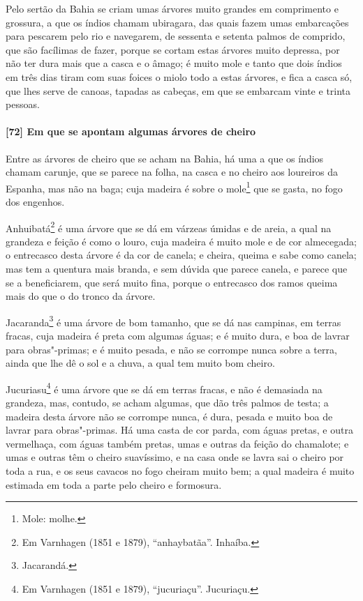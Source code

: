 \begin{linenumbers}
Pelo sertão da Bahia se criam umas árvores muito grandes em comprimento e grossura, a que
os índios chamam ubiragara, das quais fazem umas embarcações para pescarem pelo rio e
navegarem, de sessenta e setenta palmos de comprido, que são facílimas de fazer, porque se
cortam estas árvores muito depressa, por não ter dura mais que a casca e o âmago; é muito
mole e tanto que dois índios em três dias tiram com suas foices o miolo todo a estas
árvores, e fica a casca só, que lhes serve de canoas, tapadas as cabeças, em que se
embarcam vinte e trinta pessoas.

\paragraph{[72] Em que se apontam algumas árvores de cheiro}\quad
Entre as árvores de cheiro que se acham na Bahia, há uma a que os índios chamam carunje,
que se parece na folha, na casca e no cheiro aos loureiros da Espanha, mas não na baga;
cuja madeira é sobre o mole\footnote{ Mole: molhe.} que se gasta, no fogo dos engenhos.


Anhuibatá\footnote{ Em Varnhagen (1851 e 1879), ``anhaybatãa''. Inhaíba.} é uma árvore que
se dá em várzeas úmidas e de areia, a qual na grandeza e feição é como o louro, cuja
madeira é muito mole e de cor almecegada; o entrecasco desta árvore é da cor de canela; e
cheira, queima e sabe como canela; mas tem a quentura mais branda, e sem dúvida que parece
canela, e parece que se a beneficiarem, que será muito fina, porque o entrecasco dos ramos
queima mais do que o do tronco da árvore.

Jacaranda\footnote{ Jacarandá.} é uma árvore de bom tamanho, que se dá nas campinas, em
terras fracas, cuja madeira é preta com algumas águas; e é muito dura, e boa de lavrar
para obras"-primas; e é muito pesada, e não se corrompe nunca sobre a terra, ainda que lhe
dê o sol e a chuva, a qual tem muito bom cheiro.

Jucuriasu\footnote{ Em Varnhagen (1851 e 1879), ``jucuriaçu''. Jucuriaçu.} é uma árvore
que se dá em terras fracas, e não é demasiada na grandeza, mas, contudo, se acham algumas,
que dão três palmos de testa; a madeira desta árvore não se corrompe nunca, é dura, pesada
e muito boa de lavrar para obras"-primas. Há uma casta de cor parda, com águas pretas, e
outra vermelhaça, com águas também pretas, umas e outras da feição do chamalote; e umas e
outras têm o cheiro suavíssimo, e na casa onde se lavra sai o cheiro por toda a rua, e os
seus cavacos no fogo cheiram muito bem; a qual madeira é muito estimada em toda a parte
pelo cheiro e formosura.


\end{linenumbers}
